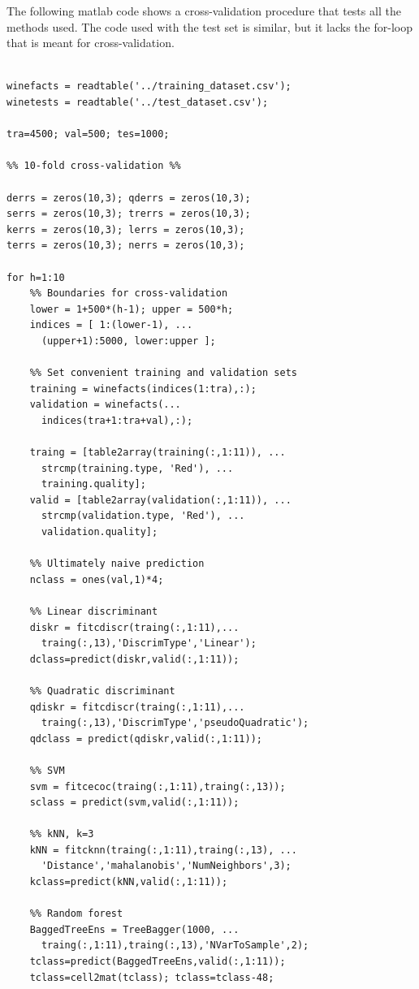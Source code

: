 \documentclass[twoside]{article}
\begin{document}
\begin{multicols}{2}
The following matlab code shows a cross-validation procedure
that tests all the methods used. The code used with the test
set is similar, but it lacks the for-loop that is meant for 
cross-validation.

{\footnotesize

\begin{verbatim}

winefacts = readtable('../training_dataset.csv');
winetests = readtable('../test_dataset.csv');

tra=4500; val=500; tes=1000;

%% 10-fold cross-validation %%

derrs = zeros(10,3); qderrs = zeros(10,3); 
serrs = zeros(10,3); trerrs = zeros(10,3); 
kerrs = zeros(10,3); lerrs = zeros(10,3); 
terrs = zeros(10,3); nerrs = zeros(10,3);

for h=1:10
    %% Boundaries for cross-validation
    lower = 1+500*(h-1); upper = 500*h;
    indices = [ 1:(lower-1), ... 
      (upper+1):5000, lower:upper ];

    %% Set convenient training and validation sets
    training = winefacts(indices(1:tra),:);
    validation = winefacts(...
      indices(tra+1:tra+val),:);

    traing = [table2array(training(:,1:11)), ... 
      strcmp(training.type, 'Red'), ...
      training.quality];
    valid = [table2array(validation(:,1:11)), ...
      strcmp(validation.type, 'Red'), ...
      validation.quality];

    %% Ultimately naive prediction
    nclass = ones(val,1)*4;
    
    %% Linear discriminant
    diskr = fitcdiscr(traing(:,1:11),...
      traing(:,13),'DiscrimType','Linear');
    dclass=predict(diskr,valid(:,1:11));

    %% Quadratic discriminant
    qdiskr = fitcdiscr(traing(:,1:11),...
      traing(:,13),'DiscrimType','pseudoQuadratic');
    qdclass = predict(qdiskr,valid(:,1:11));
    
    %% SVM
    svm = fitcecoc(traing(:,1:11),traing(:,13));
    sclass = predict(svm,valid(:,1:11));
    
    %% kNN, k=3
    kNN = fitcknn(traing(:,1:11),traing(:,13), ...
      'Distance','mahalanobis','NumNeighbors',3);
    kclass=predict(kNN,valid(:,1:11));

    %% Random forest
    BaggedTreeEns = TreeBagger(1000, ...
      traing(:,1:11),traing(:,13),'NVarToSample',2);
    tclass=predict(BaggedTreeEns,valid(:,1:11));
    tclass=cell2mat(tclass); tclass=tclass-48;


\end{verbatim}}
\end{multicols}
\end{document}
